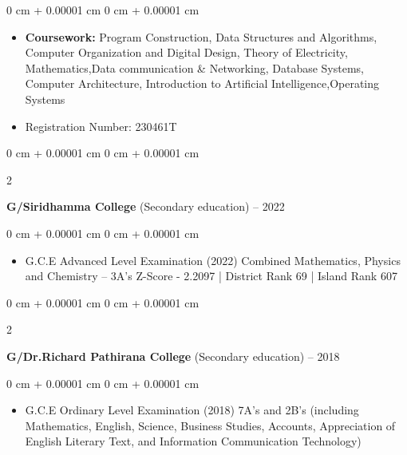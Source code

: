 \documentclass[10pt, letterpaper]{article}
\newenvironment{highlights}{
    \begin{itemize}[
        topsep=0.10 cm,
        parsep=0.10 cm,
        partopsep=0pt,
        itemsep=0pt,
        leftmargin=0 cm + 10pt
    ]
}{
    \end{itemize}
} %
\newenvironment{onecolentry}{
    \begin{adjustwidth}{
        0 cm + 0.00001 cm
    }{
        0 cm + 0.00001 cm
    }
}{
    \end{adjustwidth}
} %
\newenvironment{twocolentry}[2][]{
    \onecolentry
    \def\secondColumn{#2}
    \setcolumnwidth{\fill, 4.5 cm}
    \begin{paracol}{2}
}{
    \switchcolumn \raggedleft \secondColumn
    \end{paracol}
    \endonecolentry
} %
\begin{document}
        \vspace{0.10 cm}
        \begin{onecolentry}
            \begin{highlights}
                
                \item \textbf{Coursework:} Program Construction, Data Structures and Algorithms, Computer Organization and Digital Design, Theory of Electricity, Mathematics,Data communication & Networking, Database Systems, Computer Architecture, Introduction to Artificial Intelligence,Operating Systems
                \item Registration Number: 230461T
            \end{highlights}
        \end{onecolentry}
        \vspace{0.30 cm}
        \begin{twocolentry}{
            2019 – 2022 
        }
            \textbf{G/Siridhamma College} (Secondary education)\end{twocolentry}

        \vspace{0.10 cm}
        \begin{onecolentry}
            \begin{highlights}
                \item G.C.E Advanced Level Examination (2022)
                Combined Mathematics, Physics and Chemistry – 3A's
                Z-Score - 2.2097 | District Rank 69 | Island Rank 607
            \end{highlights}
        \end{onecolentry}
        \vspace{0.30 cm}
        \begin{twocolentry}{
            2009 – 2018
        }
            \textbf{G/Dr.Richard Pathirana College} (Secondary education)\end{twocolentry}

        \vspace{0.10 cm}
        \begin{onecolentry}
            \begin{highlights}
                \item G.C.E Ordinary Level Examination (2018)
                7A's and 2B's (including Mathematics, English, Science, Business Studies, Accounts, Appreciation of English Literary Text, and Information Communication Technology)
            \end{highlights}
        \end{onecolentry}
\end{document}
